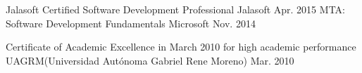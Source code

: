 \begin{cvhonors}
  \cvhonor
    {Jalasoft Certified Software Development Professional}
    {Jalasoft}
    {}
    {Apr. 2015}
  \cvhonor
    {MTA: Software Development Fundamentals}
    {Microsoft}
    { }
    {Nov. 2014}    
\end{cvhonors}

\begin{cvhonors}
  \cvhonor
    {Certificate of Academic Excellence in March 2010 for high academic performance}
    {UAGRM(Universidad Autónoma Gabriel Rene Moreno)}
    {}
    {Mar. 2010}
\end{cvhonors}